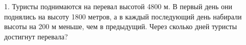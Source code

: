 1. Туристы поднимаются на перевал высотой 4800 м. В первый день они поднялись на высоту 1800 метров, а в каждый последующий день набирали высоты на 200 м меньше, чем в предыдущий. Через сколько дней туристы достигнут перевала?\\
